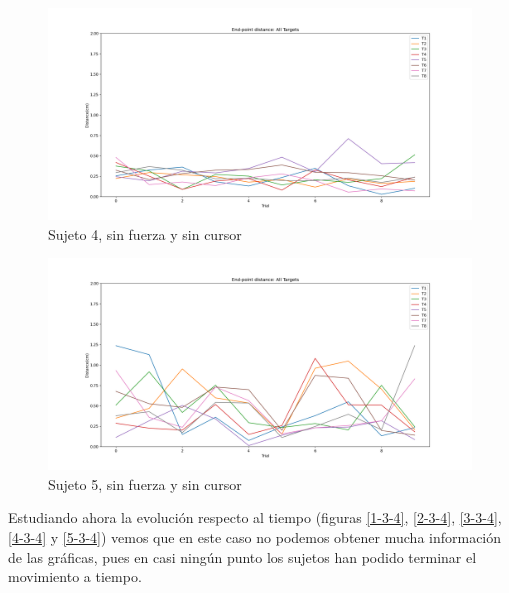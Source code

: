 \documentclass[a4paper,11pt, oneside]{book}
\begin{document}
\begin{figure}[H]
	\includegraphics[width=\linewidth]{sujeto4/no_force_no_cursor/evolution_distance}
	\caption{Sujeto 4, sin  fuerza y sin cursor}
	\label{4-3-3}
\end{figure}
\begin{figure}[H]
	\includegraphics[width=\linewidth]{sujeto5/no_force_no_cursor/evolution_distance}
	\caption{Sujeto 5, sin  fuerza y sin cursor}
	\label{5-3-3}
\end{figure}


Estudiando ahora la evolución respecto al tiempo (figuras \ref{1-3-4}, \ref{2-3-4}, \ref{3-3-4}, \ref{4-3-4} y \ref{5-3-4}) vemos que en este caso no podemos obtener mucha información de las gráficas, pues en casi ningún punto los sujetos han podido terminar el movimiento a tiempo.
\end{document}
